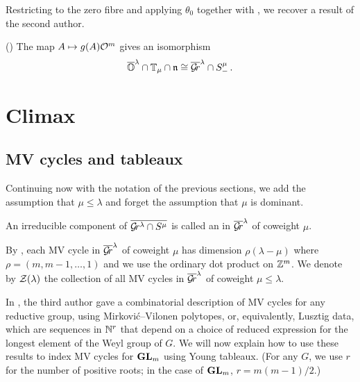 \documentclass{article}
\begin{document}
Restricting to the zero fibre and applying $\theta_0$ together with , we recover a result of the second author. 
\begin{corollary}
    \label{cor:mvy} (\cite[Corollary~5.2.2]{dthesis})
The map $ A \mapsto g(A)\mathcal O^m$ gives an isomorphism 
$$\overline{\mathbb O}^\lambda \cap \mathbb T_\mu\cap\mathfrak n \cong\overline{\mathcal{G}\!r}^\lambda\cap S^\mu_-\,.$$
\end{corollary}
% 

\section{Climax}
\label{s:climax}
% 
\subsection{MV cycles and tableaux}
\label{ss:mvcs}
% 

Continuing now with the notation of the previous sections, we add the assumption that $\mu\le\lambda$ and forget the assumption that $\mu$ is dominant. 
% 
\begin{definition}
    An irreducible component of $\overline{\mathcal{G}\!r^\lambda \cap S^\mu}$ is called an  in $\overline{\mathcal{G}\!r}^\lambda$ of coweight $\mu$. 
\end{definition}

By \cite[Theorem~3.2(b)]{mirkovic2007geometric}, each MV cycle in $\overline{\mathcal{G}\!r}^\lambda$ of coweight $\mu$ has dimension $ \rho(\lambda - \mu)$ where $ \rho = (m, m-1, \dots, 1)$ and we use the ordinary dot product on $\mathbb Z^m$. We denote by $\mathcal Z(\lambda)$ the collection of all MV cycles in $\overline{\mathcal{G}\!r}^\lambda$ of coweight $\mu\le\lambda$. 

In \cite{kamnitzer2010mirkovic}, the third author gave a combinatorial description of MV cycles for any reductive group, using Mirkovi\'c--Vilonen polytopes, or, equivalently, Lusztig data, which are sequences in $\mathbb N^{r}$ that depend on a choice of reduced expression for the longest element of the Weyl group of $G$.  We will now explain how to use these results to index MV cycles for $ {\mathbf{GL}}_m$ using Young tableaux. (For any $ G$, we use $ r $ for the number of positive roots; in the case of $ {\mathbf{GL}}_m$, $ r = m(m-1)/2$.)
\end{document}
